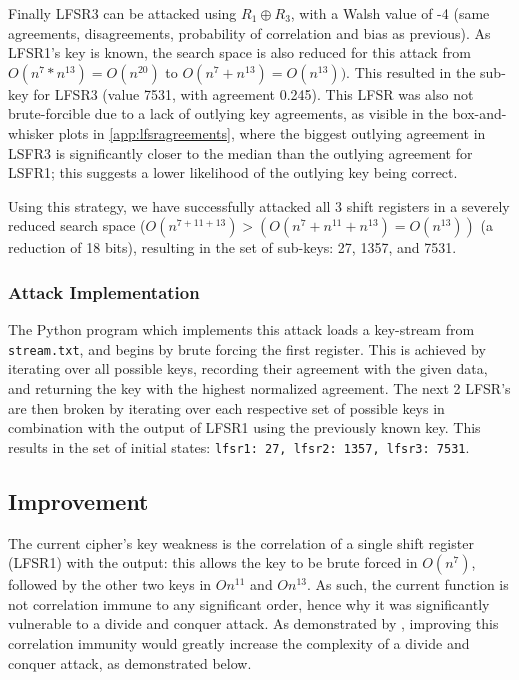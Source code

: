 \documentclass[british,10pt,a4paper]{article}
\begin{document}
Finally LFSR3 can be attacked using \(R_1 \oplus R_3\), with a Walsh value of -4 (same agreements, disagreements, probability of correlation and bias as previous).
As LFSR1's key is known, the search space is also reduced for this attack from \(O(n^{7} * n^{13})=O(n^{20})\) to \(O(n^7 + n^{13})=O(n^{13}))\). This resulted in the sub-key for LFSR3 (value 7531, with agreement 0.245). This LFSR was also not brute-forcible due to a lack of outlying key agreements, as visible in the box-and-whisker plots in \autoref{app:lfsragreements}, where the biggest outlying agreement in LSFR3 is significantly closer to the median than the outlying agreement for LSFR1; this suggests a lower likelihood of the outlying key being correct.

Using this strategy, we have successfully attacked all 3 shift registers in a severely reduced search space (\(O(n^{7+11+13})>(O(n^{7}+n^{11}+n^{13})=O(n^{13}))\) (a reduction of 18 bits), resulting in the set of sub-keys: 27, 1357, and 7531.

\subsubsection{Attack Implementation}
The Python program which implements this attack loads a key-stream from \lstinline{stream.txt}, and begins by brute forcing the first register.
This is achieved by iterating over all possible keys, recording their agreement with the given data, and returning the key with the highest normalized agreement.
The next 2 LFSR's are then broken by iterating over each respective set of possible keys in combination with the output of LFSR1 using the previously known key.
This results in the set of initial states: \lstinline{lfsr1: 27, lfsr2: 1357, lfsr3: 7531}.

\subsection{Improvement}
The current cipher's key weakness is the correlation of a single shift register (LFSR1) with the output: this allows the key to be brute forced in \(O(n^7)\), followed by the other two keys in \(On^{11}\) and \(On^{13}\).
As such, the current function is not correlation immune to any significant order, hence why it was significantly vulnerable to a divide and conquer attack. As demonstrated by \citet{siegenthaler}, improving this correlation immunity would greatly increase the complexity of a divide and conquer attack, as demonstrated below.
\end{document}
